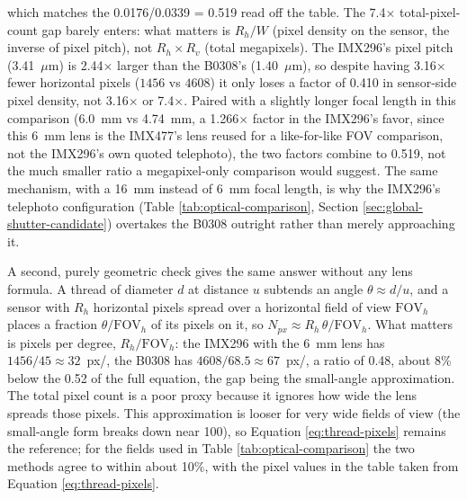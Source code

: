which matches the 0.0176/0.0339 = 0.519 read off the table. The 7.4$\times$ total-pixel-count gap barely enters: what matters is $R_h/W$ (pixel density on the sensor, the inverse of pixel pitch), not $R_h \times R_v$ (total megapixels). The IMX296's pixel pitch (3.41~$\mu$m) is 2.44$\times$ larger than the B0308's (1.40~$\mu$m), so despite having 3.16$\times$ fewer horizontal pixels ($1456$ vs $4608$) it only loses a factor of 0.410 in sensor-side pixel density, not 3.16$\times$ or 7.4$\times$. Paired with a slightly longer focal length in this comparison (6.0~mm vs 4.74~mm, a 1.266$\times$ factor in the IMX296's favor, since this 6~mm lens is the IMX477's lens reused for a like-for-like FOV comparison, not the IMX296's own quoted telephoto), the two factors combine to 0.519, not the much smaller ratio a megapixel-only comparison would suggest. The same mechanism, with a 16~mm instead of 6~mm focal length, is why the IMX296's telephoto configuration (Table \ref{tab:optical-comparison}, Section \ref{sec:global-shutter-candidate}) overtakes the B0308 outright rather than merely approaching it.

A second, purely geometric check gives the same answer without any lens formula. A thread of diameter $d$ at distance $u$ subtends an angle $\theta \approx d/u$, and a sensor with $R_h$ horizontal pixels spread over a horizontal field of view $\text{FOV}_h$ places a fraction $\theta/\text{FOV}_h$ of its pixels on it, so $N_{px} \approx R_h\,\theta/\text{FOV}_h$. What matters is pixels per degree, $R_h/\text{FOV}_h$: the IMX296 with the 6~mm lens has $1456/45 \approx 32$~px/\textdegree{}, the B0308 has $4608/68.5 \approx 67$~px/\textdegree{}, a ratio of 0.48, about 8\% below the 0.52 of the full equation, the gap being the small-angle approximation. The total pixel count is a poor proxy because it ignores how wide the lens spreads those pixels. This approximation is looser for very wide fields of view (the small-angle form breaks down near 100\textdegree{}), so Equation \ref{eq:thread-pixels} remains the reference; for the fields used in Table \ref{tab:optical-comparison} the two methods agree to within about 10\%, with the pixel values in the table taken from Equation \ref{eq:thread-pixels}.

